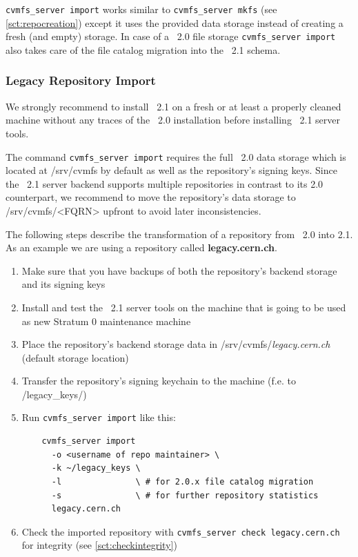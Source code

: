 \texttt{cvmfs\_server import} works similar to \texttt{cvmfs\_server mkfs} (see \ref{sct:repocreation}) except it uses the provided data storage instead of creating a fresh (and empty) storage.
In case of a \cvmfs\ 2.0 file storage \texttt{cvmfs\_server import} also takes care of the file catalog migration into the \cvmfs\ 2.1 schema.

\subsubsection{Legacy Repository Import}
We strongly recommend to install \cvmfs\ 2.1 on a fresh or at least a properly cleaned  machine without any traces of the \cvmfs\ 2.0 installation before installing \cvmfs\ 2.1 server tools.

The command \texttt{cvmfs\_server import} requires the full \cvmfs\ 2.0 data storage which is located at /srv/cvmfs by default as well as the repository's signing keys.
Since the \cvmfs\ 2.1 server backend supports multiple repositories in contrast to its 2.0 counterpart, we recommend to move the repository's data storage to /srv/cvmfs/<FQRN> upfront to avoid later inconsistencies.

The following steps describe the transformation of a repository from \cvmfs\ 2.0 into 2.1. As an example we are using a repository called \textbf{legacy.cern.ch}.
\begin{enumerate}
	\item Make sure that you have backups of both the repository's backend storage and its signing keys
	\item Install and test the \cvmfs\ 2.1 server tools on the machine that is going to be used as new Stratum 0 maintenance machine
	\item Place the repository's backend storage data in /srv/cvmfs/\textit{legacy.cern.ch} \\ (default storage location)
	\item Transfer the repository's signing keychain to the machine (f.e. to \textapprox/legacy\_keys/)
	\item Run \texttt{cvmfs\_server import} like this:
\begin{verbatim}
    cvmfs_server import
      -o <username of repo maintainer> \
      -k ~/legacy_keys \
      -l               \ # for 2.0.x file catalog migration
      -s               \ # for further repository statistics
      legacy.cern.ch
\end{verbatim}
    \item Check the imported repository with \texttt{cvmfs\_server check legacy.cern.ch} for integrity (see \ref{sct:checkintegrity})
\end{enumerate}


